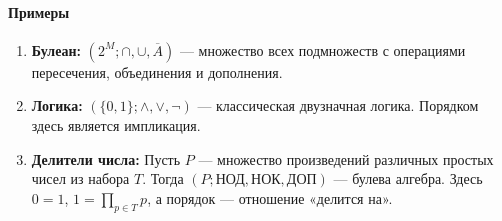 \paragraph{Примеры}
\begin{enumerate}
    \item \textbf{Булеан:} $(2^M; \cap, \cup, \overline{A})$ — множество всех подмножеств с операциями пересечения, объединения и дополнения.
    \item \textbf{Логика:} $(\{0, 1\}; \land, \lor, \neg)$ — классическая двузначная логика. Порядком здесь является импликация.
    \item \textbf{Делители числа:} Пусть $P$ — множество произведений различных простых чисел из набора $T$. Тогда $(P; \text{НОД}, \text{НОК}, \text{ДОП})$ — булева алгебра.
    Здесь $0 = 1$, $1 = \prod_{p \in T} p$, а порядок — отношение «делится на».
\end{enumerate}